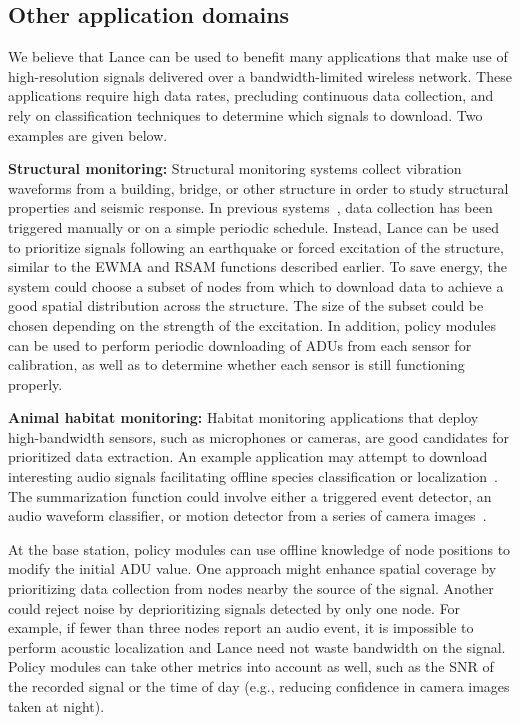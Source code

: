 \subsection{Other application domains}

We believe that Lance can be used to benefit many applications that make use
of high-resolution signals delivered over a bandwidth-limited wireless
network. These applications require high data rates, precluding continuous
data collection, and rely on classification techniques to determine which
signals to download. Two examples are given below.

{\bf Structural monitoring:}
Structural monitoring systems collect vibration
waveforms from a building, bridge, or other structure in order to
study structural properties and seismic response.
In previous systems~\cite{netshm-emnets05,ggb-ipsn07}, data collection
has been triggered manually or on a simple periodic schedule. Instead,
Lance can be used to prioritize signals following an earthquake or 
forced excitation of the structure, similar to the EWMA and RSAM
functions described earlier. To save energy, the system could choose a
subset of nodes from which to download data to achieve a good spatial
distribution across the structure. The size of the subset could be
chosen depending on the strength of the excitation. In addition, 
policy modules can be used to perform periodic downloading of ADUs 
from each sensor for calibration, as well as to determine whether 
each sensor is still functioning properly.

{\bf Animal habitat monitoring:}
Habitat monitoring applications that deploy high-bandwidth sensors, such as
microphones or cameras, are good candidates for prioritized data extraction. 
An example application may attempt to download interesting audio signals
facilitating offline species classification or 
localization~\cite{girod-ipsn07}. The summarization function could
involve either a triggered event detector, an audio waveform
classifier, or motion detector from a series of camera images~\cite{cyclops}.

At the base station, policy modules can use offline knowledge of node
positions to modify the initial ADU value. One approach might enhance
spatial coverage by prioritizing data collection from nodes nearby the
source of the signal. Another could reject noise by deprioritizing signals
detected by only one node. For example, if fewer than three nodes
report an audio event, it is impossible to perform acoustic
localization and Lance need not waste bandwidth on the signal.
Policy modules can take other metrics into account as well, 
such as the SNR of the recorded signal or the time of day (e.g.,
reducing confidence in camera images taken at night).

